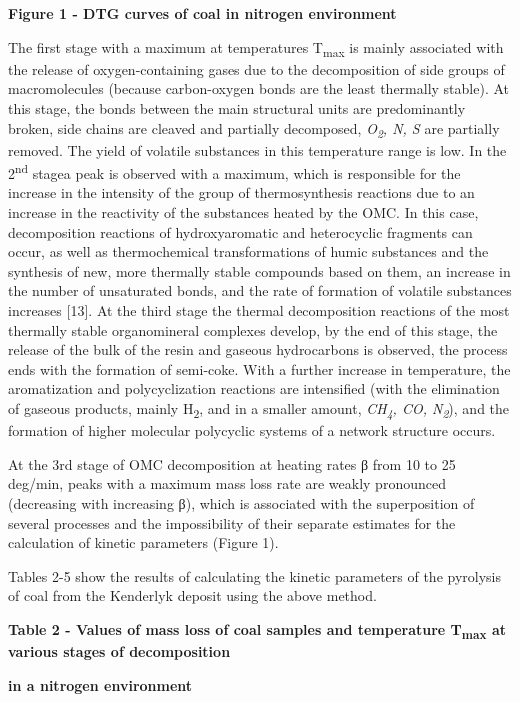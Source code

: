 \textbf{Figure 1 - DTG curves of coal in nitrogen environment}

The first stage with a maximum at temperatures T\textsubscript{max} is
mainly associated with the release of oxygen-containing gases due to the
decomposition of side groups of macromolecules (because carbon-oxygen
bonds are the least thermally stable). At this stage, the bonds between
the main structural units are predominantly broken, side chains are
cleaved and partially decomposed, \emph{O\textsubscript{2}, N, S} are
partially removed. The yield of volatile substances in this temperature
range is low. In the 2\textsuperscript{nd} stagea peak is observed with
a maximum, which is responsible for the increase in the intensity of the
group of thermosynthesis reactions due to an increase in the reactivity
of the substances heated by the OMC. In this case, decomposition
reactions of hydroxyaromatic and heterocyclic fragments can occur, as
well as thermochemical transformations of humic substances and the
synthesis of new, more thermally stable compounds based on them, an
increase in the number of unsaturated bonds, and the rate of formation
of volatile substances increases {[}13{]}. At the third stage the
thermal decomposition reactions of the most thermally stable
organomineral complexes develop, by the end of this stage, the release
of the bulk of the resin and gaseous hydrocarbons is observed, the
process ends with the formation of semi-coke. With a further increase in
temperature, the aromatization and polycyclization reactions are
intensified (with the elimination of gaseous products, mainly
H\textsubscript{2}, and in a smaller amount, \emph{CH\textsubscript{4},
CO, N\textsubscript{2}}), and the formation of higher molecular
polycyclic systems of a network structure occurs.

At the 3rd stage of OMC decomposition at heating rates β from 10 to 25
deg/min, peaks with a maximum mass loss rate are weakly pronounced
(decreasing with increasing β), which is associated with the
superposition of several processes and the impossibility of their
separate estimates for the calculation of kinetic parameters (Figure 1).

Tables 2-5 show the results of calculating the kinetic parameters of the
pyrolysis of coal from the Kenderlyk deposit using the above method.

\textbf{Table 2 - Values of mass loss of coal samples and temperature
T\textsubscript{max} at various stages of decomposition}

\textbf{in a nitrogen environment}

